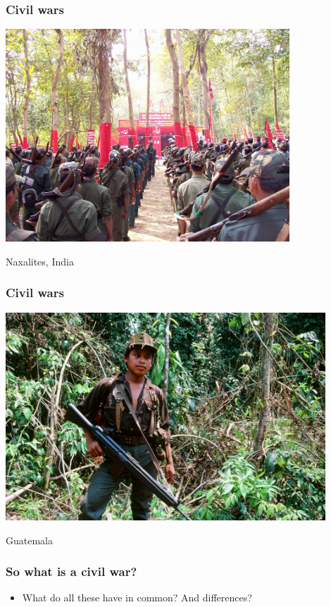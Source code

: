\documentclass[utf8, xcolor=dvipsnames]{beamer}
\begin{document}
\begin{frame}
\frametitle{Civil wars}
\centering

\includegraphics[width = 0.8\textwidth]{img/naxalites}

Naxalites, India

\end{frame}

\begin{frame}
\frametitle{Civil wars}
\centering

\includegraphics[width = 0.9\textwidth]{img/ixcan1988}

Guatemala

\end{frame}


\begin{frame}
\frametitle{So what is a civil war?}
\centering

\begin{itemize}
  \item What do all these have in common? And differences?
\end{itemize}

\end{frame}
\end{document}
